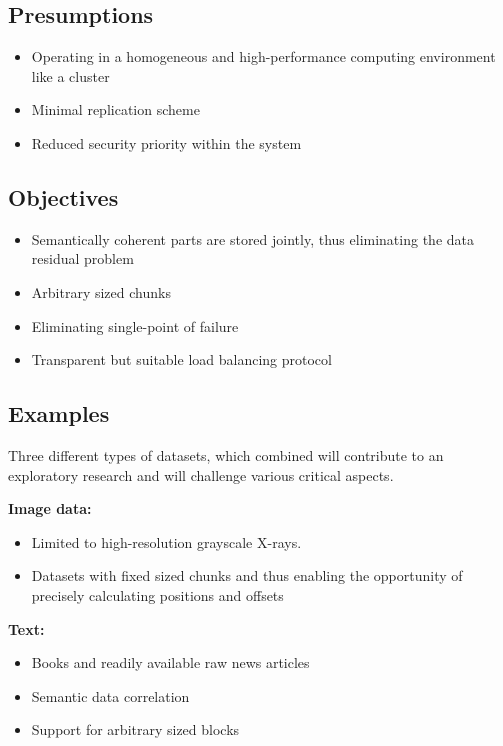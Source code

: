 \documentclass[paper=128mm:96mm, fontsize=11pt, pagesize, parskip=half-,]{scrartcl}
\theoremstyle{definition}
\newcommand*{\newslide}{\clearpage}
\begin{document}
\begin{multicols}{2}

\subsection{Presumptions}
\begin{itemize}
	\item Operating in a homogeneous and high-performance computing environment like a cluster
	\item Minimal replication scheme
	\item Reduced security priority within the system
\end{itemize}
\vfill \null

\columnbreak
\subsection{Objectives}
\begin{itemize}
	\item Semantically coherent parts are stored jointly, thus eliminating the data residual problem
	\item Arbitrary sized chunks
	\item Eliminating single-point of failure
	\item Transparent but suitable load balancing protocol
\end{itemize}
\vfill \null

\end{multicols}
\newslide

\subsection{Examples}
Three different types of datasets, which combined will contribute to an \newline exploratory research and will challenge various critical aspects.

\textbf{Image data: }
\vspace*{-2mm}
\begin{itemize}
	\item Limited to high-resolution grayscale X-rays.
	\item Datasets with fixed sized chunks and thus enabling the opportunity of precisely calculating positions and offsets
\end{itemize}

\textbf{Text: }
\vspace*{-2mm}
\begin{itemize}
	\item Books and readily available raw news articles
	\item Semantic data correlation
	\item Support for arbitrary sized blocks
\end{itemize}
\end{document}
